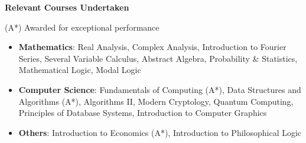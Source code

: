 \documentclass[letterpaper,11pt]{article}
\begin{document}
{\begin{itemize}
\begin{itemize}
            \vspace{-2pt}
        \end{itemize}
            \vspace{-5pt}
\end{itemize}

\vspace{-1pt}
\Large{\textbf{Relevant Courses Undertaken}}
\footnotesize{\hfill(A*) Awarded for exceptional performance \hspace{0.25in}\\
\small
\vspace{-5pt}
\begin{itemize}
    \item \textbf{Mathematics}:
        Real Analysis, Complex Analysis, Introduction to Fourier Series, Several Variable Calculus,
        Abstract Algebra, Probability \& Statistics, Mathematical Logic, Modal Logic\\
        \vspace{-2pt}
    \item \textbf{Computer Science}: Fundamentals of Computing (A*), Data Structures and Algorithms (A*), Algorithms II, Modern Cryptology, Quantum Computing, Principles of Database Systems, Introduction to Computer Graphics\\
        \vspace{-2pt}
    \item \textbf{Others}: Introduction to Economics (A*), Introduction to Philosophical Logic\\
        \vspace{-2pt}
\end{itemize}

}}
\end{document}
